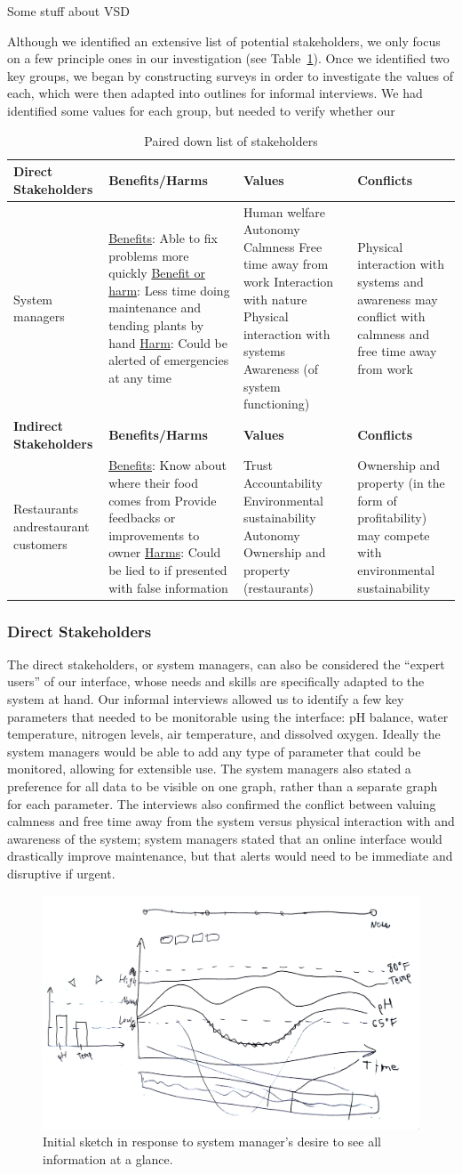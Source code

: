 \documentclass{sigchi}
\newcommand\tabhead[1]{\small\textbf{#1}}
\newcommand{\stakeholdertable}{
\begin{table}
  \centering
  	\begin{tabularx}{0.9\textwidth}{|X|X|X|X|}
    \hline
    \tabhead{Direct Stakeholders} & \tabhead{Benefits/Harms} & \tabhead{Values} & \tabhead{Conflicts} \\
    \hline
    System managers & 
		\underline{Benefits}: Able to fix problems more quickly\newline
		\underline{Benefit or harm}: Less time doing maintenance and tending plants by hand\newline
		\underline{Harm}: Could be alerted of emergencies at any time
	&	Human welfare\newline
	 	Autonomy\newline
		Calmness\newline
		Free time away from work\newline
		Interaction with nature\newline
		Physical interaction with systems\newline
		Awareness (of system functioning)
	& Physical interaction with systems and awareness may conflict with calmness and free time away from work \\
    \hline
    \tabhead{Indirect Stakeholders} & \tabhead{Benefits/Harms} & \tabhead{Values} & \tabhead{Conflicts} \\
    \hline
    Restaurants and\newline restaurant customers &
		\underline{Benefits}: Know about where their food comes from\newline
		Provide feedbacks or improvements to owner\newline
		\underline{Harms}: Could be lied to if presented with false information
	&	Trust\newline
		Accountability\newline
		Environmental sustainability\newline
		Autonomy\newline
		Ownership and property (restaurants)
	&	Ownership and property (in the form of profitability) may compete with environmental sustainability\\
    \hline
  \end{tabularx}
  \caption{Paired down list of stakeholders}
  \label{tab:stakeholders}
\end{table}}
\begin{document}
Some stuff about VSD

Although we identified an extensive list of potential stakeholders, we only focus on a few principle ones in our investigation (see Table~\ref{tab:stakeholders}). Once we identified two key groups, we began by constructing surveys in order to investigate the values of each, which were then adapted into outlines for informal interviews. We had identified some values for each group, but needed to verify whether our 
\stakeholdertable

\subsubsection{Direct Stakeholders}

The direct stakeholders, or system managers, can also be considered the ``expert users'' of our interface, whose needs and skills are specifically adapted to the system at hand. Our informal interviews allowed us to identify a few key parameters that needed to be monitorable using the interface: pH balance, water temperature, nitrogen levels, air temperature, and dissolved oxygen. Ideally the system managers would be able to add any type of parameter that could be monitored, allowing for extensible use. The system managers also stated a preference for all data to be visible on one graph, rather than a separate graph for each parameter. The interviews also confirmed the conflict between valuing calmness and free time away from the system versus physical interaction with and awareness of the system; system managers stated that an online interface would drastically improve maintenance, but that alerts would need to be immediate and disruptive if urgent. 

\begin{figure}[!h]
\centering
\includegraphics[width=0.9\columnwidth]{Sketch1}
\caption{Initial sketch in response to system manager's desire to see all information at a glance.}
\label{fig:sketch1}
\end{figure}
\end{document}
